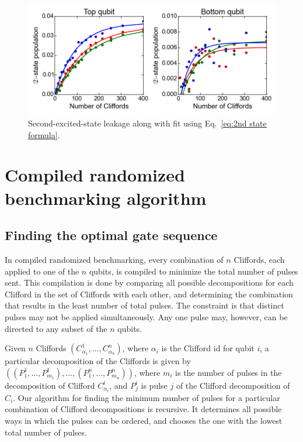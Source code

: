         \begin{figure}[h]
          \centering
          \includegraphics[width=\textwidth]{Figures/Randomized benchmarking/2nd-state leakage 2Q.png}
          \caption{Second-excited-state leakage along with fit using Eq.~\ref{eq:2nd state formula}.}
          \label{fig:second state leakage 2Q}
        \end{figure}

\chapter{Compiled randomized benchmarking algorithm}
  \label{sec:compiled randomized benchmarking algorithm}
  \section{Finding the optimal gate sequence}
    In compiled randomized benchmarking, every combination of $n$ Cliffords, each applied to one of the $n$ qubits, is compiled to minimize the total number of pulses sent. This compilation is done by comparing all possible decompositions for each Clifford in the set of Cliffords with each other, and determining the combination that results in the least number of total pulses. The constraint is that distinct pulses may not be applied simultaneously. Any one pulse may, however, can be directed to any subset of the $n$ qubits.

    Given $n$ Cliffords $\left(C_{\alpha_1}^1, \dots, C_{\alpha_n}^n\right)$, where $\alpha_i$ is the Clifford id for qubit $i$, a particular decomposition of the Cliffords is given by $\left(\left( P_1^1, ..., P_{m_1}^1 \right) , ..., \left(P_1^n, ..., P_{m_n}^n\right)\right)$, where $m_i$ is the number of pulses in the decomposition of Clifford $C_{\alpha_i}^i$, and $P_j^i$ is pulse $j$ of the Clifford decomposition of $C_i$. Our algorithm for finding the minimum number of pulses for a particular combination of Clifford decompositions is recursive. It determines all possible ways in which the pulses can be ordered, and chooses the one with the lowest total number of pulses.

